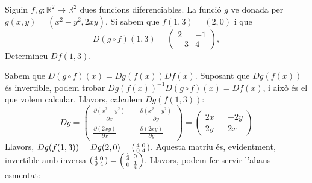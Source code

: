 \documentclass[a4paper, 12pt]{article}
\begin{document}
    \setcounter{numex}{27}
    \begin{exercici}
        Siguin $f, g : \mathbb{R}^2 \to \mathbb{R}^2$ dues funcions diferenciables. La funció $g$ ve
        donada per $g(x, y) = (x^2 - y^2, 2xy)$. Si sabem que $f(1, 3) = (2, 0)$ i que
        \begin{displaymath}
            D(g \circ f)(1,3) =
            \begin{pmatrix}
                2 & -1\\
                -3 & 4    
            \end{pmatrix},
        \end{displaymath}
        Determineu $Df(1,3)$.
    \end{exercici}
    \begin{solucio}
        Sabem que $D\left(g \circ f\right)(x) = Dg(f(x)) Df(x)$. Suposant que $Dg(f(x))$
        és invertible, podem trobar $Dg(f(x))^{-1} D\left(g \circ f\right)(x) = Df(x)$, i això és el
        que volem calcular. Llavors, calculem $Dg(f(1,3))$:
        \begin{displaymath}
            Dg =
            \begin{pmatrix}
                \frac{\partial \left(x^2-y^2\right) }{\partial x} && \frac{\partial \left(x^2-y^2\right) }{\partial y}\\
                \frac{\partial \left(2xy\right) }{\partial x} && \frac{\partial \left(2xy\right) }{\partial y}
            \end{pmatrix}
            = 
            \begin{pmatrix}
                2x && -2y\\
                2y && 2x
            \end{pmatrix}
        \end{displaymath}
        Llavors, $Dg(f(1,3)) = Dg(2,0) =
        \begin{psmallmatrix}
            4 & 0\\
            0 & 4
        \end{psmallmatrix}$.
        Aquesta matriu és, evidentment, invertible amb inversa $\begin{psmallmatrix}
            4 & 0\\
            0 & 4
        \end{psmallmatrix} = \begin{psmallmatrix}
            \frac{1}{4} & 0\\
            0 & \frac{1}{4}
        \end{psmallmatrix}$. Llavors, podem fer servir l'abans esmentat:

\end{solucio}
\end{document}
